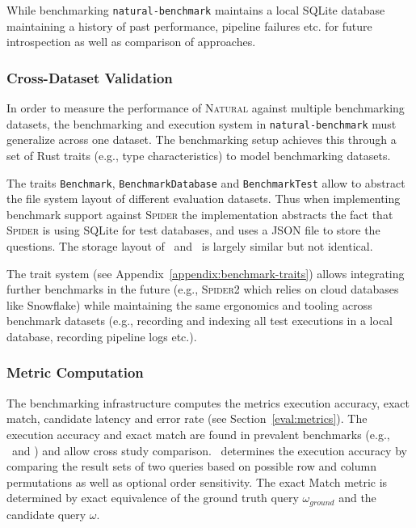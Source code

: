 While benchmarking \texttt{natural-benchmark} maintains a local SQLite database
maintaining a history of past performance, pipeline failures etc. for future
introspection as well as comparison of approaches.

\subsubsection{Cross-Dataset Validation}

In order to measure the performance of \textsc{Natural} against multiple
benchmarking datasets, the benchmarking and execution system in
\texttt{natural-benchmark} must generalize across one dataset. The
benchmarking setup achieves this through a set of Rust traits (e.g., type
characteristics) to model benchmarking datasets. 

The traits \texttt{Benchmark}, \texttt{BenchmarkDatabase} and
\texttt{BenchmarkTest} allow to abstract the file system layout of different
evaluation datasets. Thus when implementing benchmark support against
\textsc{Spider} the implementation abstracts the fact that \textsc{Spider} is
using SQLite for test databases, and uses a JSON file to store the questions.
The storage layout of \Spider~and \Bird~is largely similar but not identical.

The trait system (see Appendix~\ref{appendix:benchmark-traits}) allows
integrating further benchmarks in the future (e.g., \textsc{Spider2} which
relies on cloud databases like Snowflake) while maintaining the same ergonomics
and tooling across benchmark datasets (e.g., recording and indexing all test
executions in a local database, recording pipeline logs etc.). 

\subsubsection{Metric Computation}

The benchmarking infrastructure computes the metrics execution accuracy, exact
match, candidate latency and error rate (see Section~\ref{eval:metrics}). The
execution accuracy and exact match are found in prevalent benchmarks (e.g.,
\Spider~and \Bird) and allow cross study comparison. \Spider~determines the
execution accuracy by comparing the result sets of two queries based on
possible row and column permutations as well as optional order sensitivity. The
exact Match metric is determined by exact equivalence of the ground truth query
$\omega_{ground}$ and the candidate query $\omega$.

